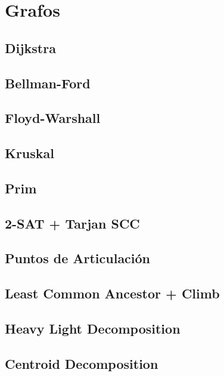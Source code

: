 \newpage
\section{Grafos}
\subsection{Dijkstra}

\subsection{Bellman-Ford}

\subsection{Floyd-Warshall}

\subsection{Kruskal}

\subsection{Prim}

\subsection{2-SAT + Tarjan SCC}

\subsection{Puntos de Articulaci\'on}

\subsection{Least Common Ancestor + Climb}

\subsection{Heavy Light Decomposition}

\subsection{Centroid Decomposition}

